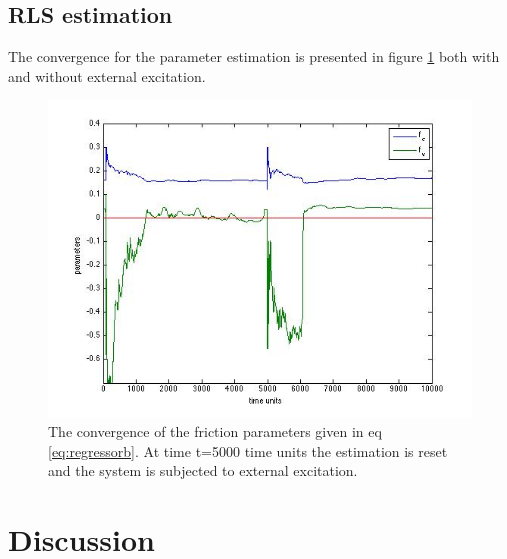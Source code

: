 \documentclass[10pt,a4paper]{article}
\begin{document}
\subsection{RLS estimation}
The convergence for the parameter estimation is presented in figure \ref{fig:rlsconv} both with and without external excitation.
\begin{figure}[H]
\centering
\includegraphics[scale=0.7]{plots/rlsconvergence.jpg}
\caption{The convergence of the friction parameters given in eq \ref{eq:regressorb}. At time t=5000 time units the estimation is reset and the system is subjected to external excitation.}
\label{fig:rlsconv}
\end{figure}




\section{Discussion}



\end{document}
